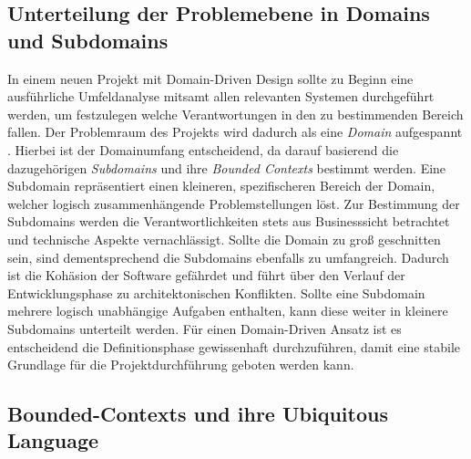 \subsection{Unterteilung der Problemebene in Domains und Subdomains}

In einem neuen Projekt mit Domain-Driven Design sollte zu Beginn eine ausführliche Umfeldanalyse mitsamt allen relevanten Systemen durchgeführt werden, um festzulegen welche Verantwortungen in den zu bestimmenden Bereich fallen. Der Problemraum des Projekts wird dadurch als eine \emph{Domain} aufgespannt \cite[S. 56]{Vernon.2015}. Hierbei ist der Domainumfang entscheidend, da darauf basierend die dazugehörigen \emph{Subdomains} und ihre \emph{Bounded Contexts} bestimmt werden. Eine Subdomain repräsentiert einen kleineren, spezifischeren Bereich der Domain, welcher logisch zusammenhängende Problemstellungen löst. Zur Bestimmung der Subdomains werden die Verantwortlichkeiten stets aus Businesssicht betrachtet und technische Aspekte vernachlässigt. Sollte die Domain zu groß geschnitten sein, sind dementsprechend die Subdomains ebenfalls zu umfangreich. Dadurch ist die Kohäsion der Software gefährdet und führt über den Verlauf der Entwicklungsphase zu architektonischen Konflikten. Sollte eine Subdomain mehrere logisch unabhängige Aufgaben enthalten, kann diese weiter in kleinere Subdomains unterteilt werden. Für einen Domain-Driven Ansatz ist es entscheidend die Definitionsphase gewissenhaft durchzuführen, damit eine stabile Grundlage für die Projektdurchführung geboten werden kann. 

\subsection{Bounded-Contexts und ihre Ubiquitous Language}

